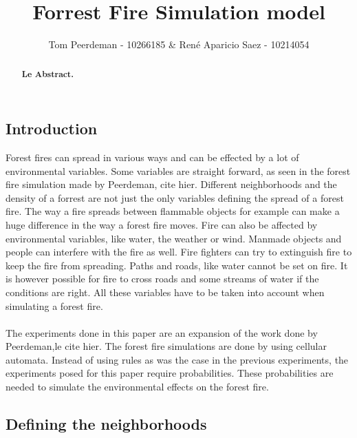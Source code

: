 \documentclass{article}
\title{Forrest Fire Simulation model}
\author{Tom Peerdeman - 10266185 \& Ren\'e Aparicio Saez - 10214054}
\begin{document}
\maketitle

\begin{abstract}
\textbf{Le Abstract.}
\end{abstract}

\begin{multicols}{2}

\subsection*{Introduction}
Forest fires can spread in various ways and can be effected by a lot of environmental variables. Some variables are straight forward, as seen in the forest fire simulation made by Peerdeman, cite hier. Different neighborhoods and the density of a forrest are not just the only variables defining the spread of a forest fire. The way a fire spreads between flammable objects for example can make a huge difference in the way a forest fire moves. Fire can also be affected by environmental variables, like water, the weather or wind. Manmade objects and people can interfere with the fire as well. Fire fighters can try to extinguish fire to keep the fire from spreading. Paths and roads, like water cannot be set on fire. It is however possible for fire to cross roads and some streams of water if the conditions are right. All these variables have to be taken into account when simulating a forest fire.\\\\
The experiments done in this paper are an expansion of the work done by Peerdeman,le cite hier. The forest fire simulations are done by using cellular automata. Instead of using rules as was the case in the previous experiments, the experiments posed for this paper require probabilities. These probabilities are needed to simulate the environmental effects on the forest fire. 

\subsection*{Defining the neighborhoods}

\end{multicols}
\end{document}

